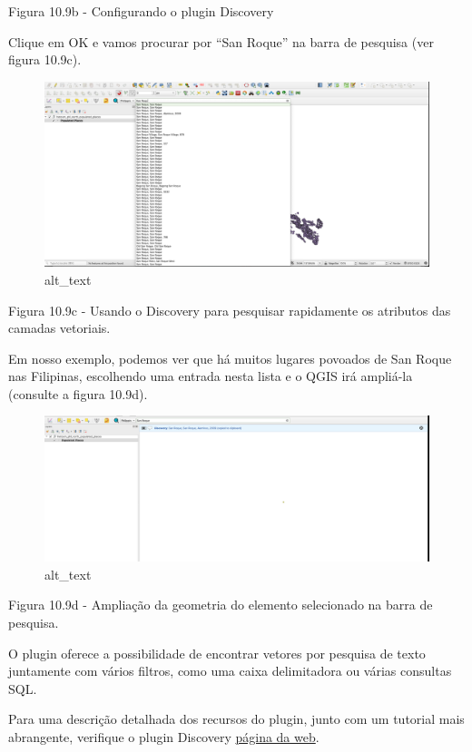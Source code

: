 \documentclass[
  portuguese,
]{krantz}
\begin{document}
Figura 10.9b - Configurando o plugin Discovery

Clique em OK e vamos procurar por ``San Roque'' na barra de pesquisa (ver figura 10.9c).

\begin{figure}
\centering
\includegraphics{media/modulo10/fig109_c.png}
\caption{alt\_text}
\end{figure}

Figura 10.9c - Usando o Discovery para pesquisar rapidamente os atributos das camadas vetoriais.

Em nosso exemplo, podemos ver que há muitos lugares povoados de San Roque nas Filipinas, escolhendo uma entrada nesta lista e o QGIS irá ampliá-la (consulte a figura 10.9d).

\begin{figure}
\centering
\includegraphics{media/modulo10/fig109_d.png}
\caption{alt\_text}
\end{figure}

Figura 10.9d - Ampliação da geometria do elemento selecionado na barra de pesquisa.

O plugin oferece a possibilidade de encontrar vetores por pesquisa de texto juntamente com vários filtros, como uma caixa delimitadora ou várias consultas SQL.

Para uma descrição detalhada dos recursos do plugin, junto com um tutorial mais abrangente, verifique o plugin Discovery \href{https://www.lutraconsulting.co.uk/projects/discovery/}{página da web}.
\end{document}
